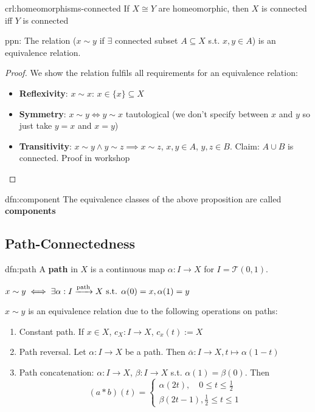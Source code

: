 \documentclass{article}
\begin{document}
\begin{crl}[]{crl:homeomorphisms-connected}{}
    If $X\cong Y$ are homeomorphic, then $X$ is connected iff $Y$ is connected
\end{crl}

\begin{ppn}[]{ppn:}{}
    The relation ($x \sim y$ if $\exists$ connected subset $A \subseteq X$ s.t. $x,y\in A$) is an equivalence relation.
\end{ppn}

\begin{proof} We show the relation fulfils all requirements for an equivalence relation:
    \begin{itemize}
        \item \textbf{Reflexivity}: $x \sim x$: $x \in \{x\} \subseteq X$
        \item \textbf{Symmetry}: $x \sim y \iff y \sim x$ tautological (we don't specify between $x$ and $y$ so just take $y = x$ and $x = y$)
        \item \textbf{Transitivity}: $x \sim y \wedge y\sim z \implies x \sim z$, $x,y\in A$, $y,z\in B$. Claim: $A \cup B$ is connected. Proof in workshop
    \end{itemize}
\end{proof}

\begin{dfn}[Components]{dfn:component}{}
    The equivalence classes of the above proposition are called \textbf{components}
\end{dfn}

\subsection{Path-Connectedness}

\begin{dfn}[Path]{dfn:path}{}
    A \textbf{path} in $X$ is a continuous map $\alpha : I \to X$ for $I = \mathcal{T}(0, 1)$.

    $x \sim y \iff \exists \alpha : I \prightarrow{\text{path}} X \text{ s.t. } \alpha(0) = x, \alpha(1) = y$
\end{dfn}

$x \sim y$ is an equivalence relation due to the following operations on paths:
\begin{enumerate}
    \item Constant path. If $x \in X$, $c_{X} : I \to X$, $c_{x}(t) := X$
    \item Path reversal. Let $\alpha : I \to X$ be a path. Then $\overline{\alpha} : I \to X, t \mapsto \alpha(1 - t)$
    \item Path concatenation: $\alpha : I \to X$, $\beta : I \to X$ s.t. $\alpha(1) = \beta(0)$. Then
        \[(a * b)(t) = \begin{cases}
            \alpha(2t), \quad 0 \le t \le \frac{1}{2} \\
            \beta(2t - 1), \frac{1}{2} \le t \le 1
        \end{cases}\]
\end{enumerate}
\end{document}
